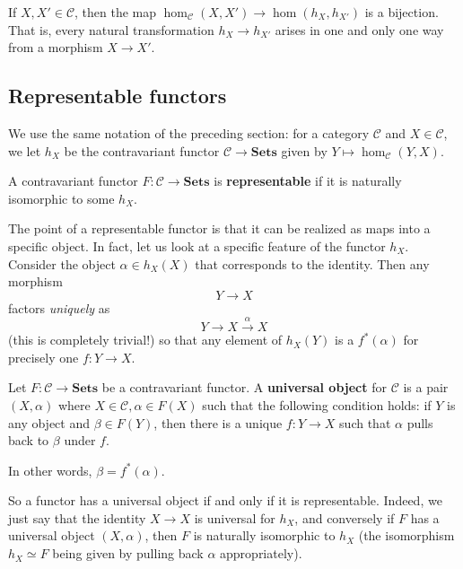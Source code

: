 \begin{theorem} If $X, X' \in \mathcal{C}$, then the map
$\hom_{\mathcal{C}}(X, X') \to \hom(h_X, h_{X'})$ is a bijection. That is,
every natural transformation $h_X \to h_{X'}$ arises in one and only one way
from a morphism $X \to X'$.
\end{theorem}


\begin{theorem}
\end{theorem}

\subsection{Representable functors}

We use  the same notation of the preceding section: for a category
$\mathcal{C}$ and $X \in \mathcal{C}$, we let $h_X$ be the contravariant
functor $\mathcal{C} \to \mathbf{Sets}$ given by $Y \mapsto
\hom_{\mathcal{C}}(Y, X)$.
\begin{definition}
A contravariant functor $F: \mathcal{C} \to \mathbf{Sets}$ is
\textbf{representable} if it is naturally isomorphic to some $h_X$.
\end{definition}

The point of a representable functor is that it can be realized as maps into a
specific object.
In fact, let us look at a specific feature of the functor $h_X$.
Consider the object $\alpha \in h_X(X)$ that corresponds to the identity.
Then any morphism
\[ Y \to X  \]
factors \emph{uniquely}
as \[ Y \to X \stackrel{\alpha}{\to } X  \]
(this is completely trivial!) so that
any element of $h_X(Y)$ is a $f^*(\alpha)$ for precisely one $f:  Y \to X$.

\begin{definition}
Let $F: \mathcal{C} \to \mathbf{Sets}$ be a contravariant functor. A
\textbf{universal object} for $\mathcal{C}$ is a pair $(X, \alpha)$ where $X
\in \mathcal{C}, \alpha \in F(X)$ such that the following condition holds:
if $Y$ is any object and $\beta \in F(Y)$, then there is a unique $f: Y \to X$
such that $\alpha$ pulls back to $\beta$ under $f$.

In other words, $\beta = f^*(\alpha)$.
\end{definition}

So a functor has a universal object if and only if it is representable.
Indeed, we just say that the identity $X \to X$ is universal for $h_X$, and
conversely if $F$ has a universal object $(X, \alpha)$, then $F$ is naturally
isomorphic to $h_X$ (the isomorphism $h_X \simeq F$ being given by pulling
back $\alpha$ appropriately).


